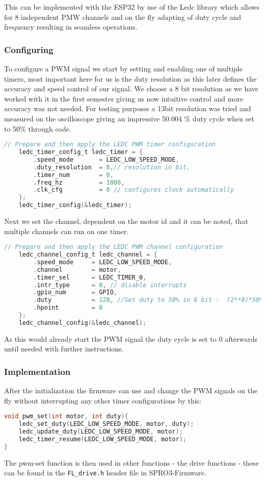 \documentclass[../report.tex]{subfiles}
\begin{document}
This can be implemented with the ESP32 by use of the Ledc library which allows 
for 8 independent PMW channels and on the fly adapting of duty cycle and frequency
resulting in seamless operations. 

\subsubsection{Configuring}
To configure a PWM signal we start by setting and enabling one of multiple timers,
most important here for us is the duty resolution as this later defines the accuracy 
and speed control of our signal. We choose a 8 bit resolution as we have worked with 
it in the first semester giving us now intuitive control and more accuracy was not needed. 
For testing purposes a 13bit resolution was tried and measured on the oscilloscope 
giving an impressive 50.004 \% duty cycle when set to 50\% through code.
\begin{lstlisting}[language=c, caption={Timer config}]
    // Prepare and then apply the LEDC PWM timer configuration
    ledc_timer_config_t ledc_timer = {
        .speed_mode       = LEDC_LOW_SPEED_MODE,
        .duty_resolution  = 8,// resolution in bit, 
        .timer_num        = 0, 
        .freq_hz          = 1000,
        .clk_cfg          = 0 // configures clock automatically 
    };
    ledc_timer_config(&ledc_timer);
\end{lstlisting}
Next we set the channel, dependent on the motor id and it can be noted, that multiple 
channels can run on one timer.
\begin{lstlisting}[language=c, caption={Channel config}]
    // Prepare and then apply the LEDC PWM channel configuration
    ledc_channel_config_t ledc_channel = {
        .speed_mode     = LEDC_LOW_SPEED_MODE, 
        .channel        = motor,
        .timer_sel      = LEDC_TIMER_0,
        .intr_type      = 0, // disable interrupts
        .gpio_num       = GPIO,
        .duty           = 128, //Set duty to 50% in 8 bit :  (2**8)*50% = 128
        .hpoint         = 0
    };
    ledc_channel_config(&ledc_channel);
\end{lstlisting}
As this would already start the PWM signal the duty cycle is set to 0 afterwards until needed with further 
instructions.
\subsubsection{Implementation}
After the initialization the firmware can use and change the PWM signals on the fly without interrupting
any other timer configurations by this: 
\begin{lstlisting}[language=c, caption={PWM Implementation}]
void pwm_set(int motor, int duty){
    ledc_set_duty(LEDC_LOW_SPEED_MODE, motor, duty);  
    ledc_update_duty(LEDC_LOW_SPEED_MODE, motor); 
    ledc_timer_resume(LEDC_LOW_SPEED_MODE, motor);
}
\end{lstlisting}
The pwm-set function is then used in other functions - the drive functions - these can be found in the \texttt{FL\_drive.h} header file in SPRO3-Firmware.
\end{document}
